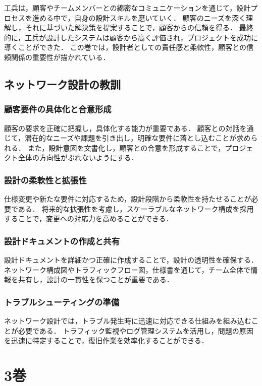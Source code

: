 \documentclass[titlepage,a4paper]{jsarticle}
\begin{document}
工兵は，顧客やチームメンバーとの綿密なコミュニケーションを通じて，設計プロセスを進める中で，自身の設計スキルを磨いていく．
顧客のニーズを深く理解し，それに基づいた解決策を提案することで，顧客からの信頼を得る．
最終的に，工兵が設計したシステムは顧客から高く評価され，プロジェクトを成功に導くことができた．
この巻では，設計者としての責任感と柔軟性，顧客との信頼関係の重要性が描かれている．

\subsection{ネットワーク設計の教訓}
\subsubsection{顧客要件の具体化と合意形成}
顧客の要求を正確に把握し，具体化する能力が重要である．
顧客との対話を通じて，潜在的なニーズや課題を引き出し，明確な要件に落とし込むことが求められる．
また，設計意図を文書化し，顧客との合意を形成することで，プロジェクト全体の方向性がぶれないようにする．

\subsubsection{設計の柔軟性と拡張性}
仕様変更や新たな要件に対応するため，設計段階から柔軟性を持たせることが必要である．
将来的な拡張性を考慮し，スケーラブルなネットワーク構成を採用することで，変更への対応力を高めることができる．

\subsubsection{設計ドキュメントの作成と共有}
設計ドキュメントを詳細かつ正確に作成することで，設計の透明性を確保する．
ネットワーク構成図やトラフィックフロー図，仕様書を通じて，チーム全体で情報を共有し，設計の一貫性を保つことが重要である．

\subsubsection{トラブルシューティングの準備}
ネットワーク設計では，トラブル発生時に迅速に対応できる仕組みを組み込むことが必要である．
トラフィック監視やログ管理システムを活用し，問題の原因を迅速に特定することで，復旧作業を効率化することができる．

\newpage
\section{3巻}
\end{document}

